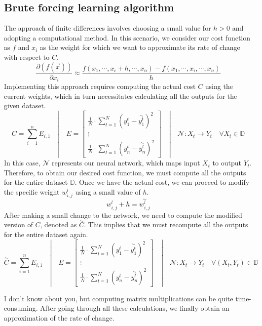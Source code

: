 \subsection{Brute forcing learning algorithm}
The approach of finite differences involves choosing a small value for $h > 0$ and adopting a
computational method. In this scenario, we consider our cost function as $f$ and $x_i$ as the weight
for which we want to approximate its rate of change with respect to $C$.
\[
\frac{\partial (f(\vec{x}))}{\partial x_i} \approx \frac{f(x_1, \cdots, x_i + h, \cdots, x_n) -
  f(x_1, \cdots, x_i, \cdots, x_n)}{h}
\]
Implementing this approach requires computing the actual cost $C$ using the current weights,
which in turn necessitates calculating all the outputs for the given dataset.
\[
C = \sum_{i = 1}^{n} E_{i, 1}
\quad | \quad
E =
\begin{bmatrix}
  \frac{1}{N} \cdot \sum_{t = 1}^{N}(y^t_{1} - \overset{\sim}{y_{1}^t})^2 \\ \vdots \\
  \frac{1}{N} \cdot \sum_{t = 1}^{N}(y^t_{n} - \overset{\sim}{y_{n}^t})^2
\end{bmatrix}
\quad | \quad \mathcal{N}: X_t \rightarrow Y_t
\quad \forall X_t \in \mathbb{D}
\]
In this case, $\mathcal{N}$ represents our neural network, which maps input $X_t$ to output $Y_t$. Therefore,
to obtain our desired cost function, we must compute all the outputs for the entire dataset
$\mathbb{D}$. Once we have the actual cost, we can proceed to modify the specific weight $w_{i, j}^l$
using a small value of $h$.
\[
w_{i, j}^l + h = \overset{\sim}{w_{i, j}^l}
\]
After making a small change to the network, we need to compute the modified version of $C$,
denoted as $\overset{\sim}{C}$. This implies that we must recompute all the outputs for the entire dataset again.
\[
\overset{\sim}{C}= \sum_{i = 1}^{n} E_{i, 1}
\quad | \quad E =
\begin{bmatrix}
  \frac{1}{N} \cdot \sum_{t = 1}^{N}(y^t_{1} - \overset{\sim}{y_{1}^t})^2 \\ \vdots \\
  \frac{1}{N} \cdot \sum_{t = 1}^{N}(y^t_{n} - \overset{\sim}{y_{n}^t})^2
\end{bmatrix}\quad | \quad \mathcal{N}: X_t \rightarrow Y_t
\quad \forall (X_t,Y_t) \in \mathbb{D}
\]

I don't know about you, but computing matrix multiplications can be quite time-consuming.
After going through all these calculations, we finally obtain an approximation of the rate of change.

